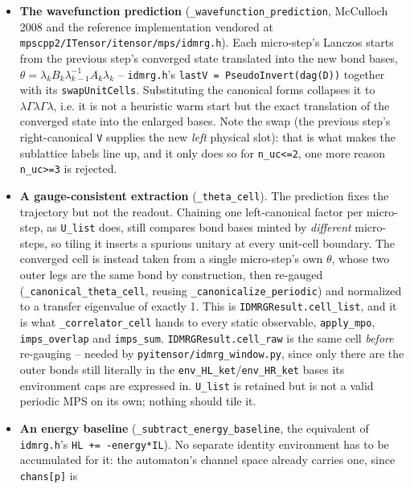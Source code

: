 \documentclass[11pt]{article}
\begin{document}
\begin{itemize}
\item \textbf{The wavefunction prediction}
  (\texttt{\_wavefunction\_prediction}, McCulloch 2008 and the reference
  implementation vendored at
  \texttt{mpscpp2/ITensor/itensor/mps/idmrg.h}). Each micro-step's
  Lanczos starts from the previous step's converged state translated into
  the new bond bases,
  $\theta = \lambda_k B_k \lambda_{k-1}^{-1} A_k \lambda_k$ --
  \texttt{idmrg.h}'s \texttt{lastV = PseudoInvert(dag(D))} together with
  its \texttt{swapUnitCells}. Substituting the canonical forms collapses
  it to $\lambda\Gamma\lambda\Gamma\lambda$, i.e. it is not a heuristic
  warm start but the exact translation of the converged state into the
  enlarged bases. Note the swap (the previous step's right-canonical
  \texttt{V} supplies the new \emph{left} physical slot): that is what
  makes the sublattice labels line up, and it only does so for
  \texttt{n\_uc<=2}, one more reason \texttt{n\_uc>=3} is rejected.
\item \textbf{A gauge-consistent extraction} (\texttt{\_theta\_cell}).
  The prediction fixes the trajectory but not the readout. Chaining one
  left-canonical factor per micro-step, as \texttt{U\_list} does, still
  compares bond bases minted by \emph{different} micro-steps, so tiling it
  inserts a spurious unitary at every unit-cell boundary. The converged
  cell is instead taken from a single micro-step's own $\theta$, whose two
  outer legs are the same bond by construction, then re-gauged
  (\texttt{\_canonical\_theta\_cell}, reusing
  \texttt{\_canonicalize\_periodic}) and normalized to a transfer
  eigenvalue of exactly 1. This is \texttt{IDMRGResult.cell\_list}, and it
  is what \texttt{\_correlator\_cell} hands to every static observable,
  \texttt{apply\_mpo}, \texttt{imps\_overlap} and \texttt{imps\_sum}.
  \texttt{IDMRGResult.cell\_raw} is the same cell \emph{before} re-gauging
  -- needed by \texttt{pyitensor/idmrg\_window.py}, since only there are
  the outer bonds still literally in the
  \texttt{env\_HL\_ket}/\texttt{env\_HR\_ket} bases its environment caps
  are expressed in. \texttt{U\_list} is retained but is not a valid
  periodic MPS on its own; nothing should tile it.
\item \textbf{An energy baseline}
  (\texttt{\_subtract\_energy\_baseline}, the equivalent of
  \texttt{idmrg.h}'s \texttt{HL += -energy*IL}). No separate identity
  environment has to be accumulated for it: the automaton's channel space
  already carries one, since \texttt{chans[p]} is

\end{itemize}
\end{document}
